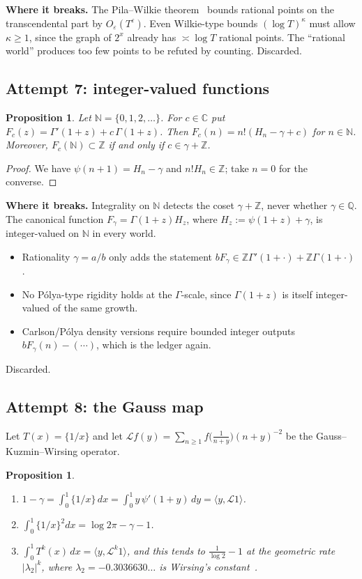 \documentclass[11pt,a4paper]{article}
\newtheorem{proposition}[theorem]{Proposition}
\theoremstyle{definition}
\theoremstyle{remark}
\newcommand{\Q}{\mathbb Q}
\newcommand{\Z}{\mathbb Z}
\newcommand{\N}{\mathbb N}
\newcommand{\C}{\mathbb C}
\numberwithin{equation}{section}
\begin{document}
\noindent\textbf{Where it breaks.} The Pila--Wilkie theorem~\cite{p4:PW} bounds rational points on the transcendental part by $O_\varepsilon(T^\varepsilon)$. Even Wilkie-type bounds $(\log T)^\kappa$ must allow $\kappa\ge1$, since the graph of $2^x$ already has $\asymp\log T$ rational points. The ``rational world'' produces too few points to be refuted by counting. Discarded.

\subsection{Attempt 7: integer-valued functions}

\begin{proposition}\label{p4:prop:intval}
Let $\N=\{0,1,2,\dots\}$. For $c\in\C$ put $F_c(z)=\Gamma'(1+z)+c\,\Gamma(1+z)$. Then $F_c(n)=n!(H_n-\gamma+c)$ for $n\in\N$. Moreover, $F_c(\N)\subset\Z$ if and only if $c\in\gamma+\Z$.
\end{proposition}

\begin{proof}
We have $\psi(n+1)=H_n-\gamma$ and $n!H_n\in\Z$; take $n=0$ for the converse.
\end{proof}

\noindent\textbf{Where it breaks.} Integrality on $\N$ detects the coset $\gamma+\Z$, never whether $\gamma\in\Q$. The canonical function $F_\gamma=\Gamma(1+z)H_z$, where $H_z:=\psi(1+z)+\gamma$, is integer-valued on $\N$ in every world.
\begin{itemize}[leftmargin=2em]
\item Rationality $\gamma=a/b$ only adds the statement $bF_\gamma\in\Z\Gamma'(1+\cdot)+\Z\Gamma(1+\cdot)$.
\item No P\'olya-type rigidity holds at the $\Gamma$-scale, since $\Gamma(1+z)$ is itself integer-valued of the same growth.
\item Carlson/P\'olya density versions require bounded integer outputs $bF_\gamma(n)-(\cdots)$, which is the ledger again.
\end{itemize}
Discarded.

\subsection{Attempt 8: the Gauss map}

Let $T(x)=\{1/x\}$ and let $\mathcal L f(y)=\sum_{n\ge1}f\bigl(\frac1{n+y}\bigr)(n+y)^{-2}$ be the Gauss--Kuzmin--Wirsing operator.

\begin{proposition}\label{p4:prop:gauss}
\begin{enumerate}[label=(\alph*),leftmargin=2em]
\item $1-\gamma=\int_0^1\{1/x\}\,dx=\int_0^1y\,\psi'(1+y)\,dy=\langle y,\mathcal L1\rangle$.
\item $\int_0^1\{1/x\}^2dx=\log2\pi-\gamma-1$.
\item $\int_0^1T^k(x)\,dx=\langle y,\mathcal L^k1\rangle$, and this tends to $\frac1{\log2}-1$ at the geometric rate $|\lambda_2|^k$, where $\lambda_2=-0.3036630\ldots$ is Wirsing's constant~\cite{p4:Wir}.
\end{enumerate}
\end{proposition}
\end{document}
